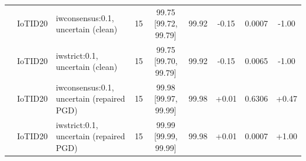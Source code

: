 \begin{table}[t]
\begin{tabular}{lllcccccc}
 & IoTID20 & iwconsensus:0.1, uncertain (clean) & 15 & 99.75 [99.72, 99.79] & 99.92 & -0.15 & 0.0007 & -1.00 \\
 & IoTID20 & iwstrict:0.1, uncertain (clean) & 15 & 99.75 [99.70, 99.79] & 99.92 & -0.15 & 0.0065 & -1.00 \\
 & IoTID20 & iwconsensus:0.1, uncertain (repaired PGD) & 15 & 99.98 [99.97, 99.99] & 99.98 & +0.01 & 0.6306 & +0.47 \\
 & IoTID20 & iwstrict:0.1, uncertain (repaired PGD) & 15 & 99.99 [99.99, 99.99] & 99.98 & +0.01 & 0.0007 & +1.00 \\
\bottomrule
\end{tabular}
\end{table}
